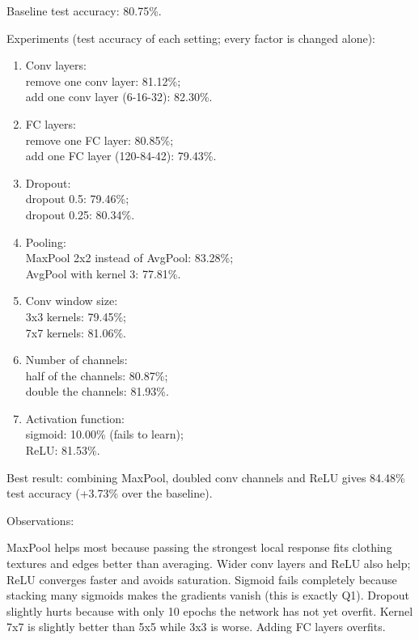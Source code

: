 \documentclass[11pt,a4paper]{article}
\begin{document}
Baseline test accuracy: 80.75\%.

Experiments (test accuracy of each setting; every factor is changed
alone):

\begin{enumerate}
    \item[(a)] Conv layers: \\
    remove one conv layer: 81.12\%; \\
    add one conv layer (6-16-32): 82.30\%.

    \item[(b)] FC layers: \\
    remove one FC layer: 80.85\%; \\
    add one FC layer (120-84-42): 79.43\%.

    \item[(c)] Dropout: \\
    dropout 0.5: 79.46\%; \\
    dropout 0.25: 80.34\%.

    \item[(d)] Pooling: \\
    MaxPool 2x2 instead of AvgPool: 83.28\%; \\
    AvgPool with kernel 3: 77.81\%.

    \item[(e)] Conv window size: \\
    3x3 kernels: 79.45\%; \\
    7x7 kernels: 81.06\%.

    \item[(f)] Number of channels: \\
    half of the channels: 80.87\%; \\
    double the channels: 81.93\%.

    \item[(g)] Activation function: \\
    sigmoid: 10.00\% (fails to learn); \\
    ReLU: 81.53\%.
\end{enumerate}

Best result: combining MaxPool, doubled conv channels and ReLU gives
84.48\% test accuracy (+3.73\% over the baseline).

Observations:

MaxPool helps most because passing the strongest local response fits
clothing textures and edges better than averaging. Wider conv layers and
ReLU also help; ReLU converges faster and avoids saturation. Sigmoid
fails completely because stacking many sigmoids makes the gradients
vanish (this is exactly Q1). Dropout slightly hurts because with only 10
epochs the network has not yet overfit. Kernel 7x7 is slightly better
than 5x5 while 3x3 is worse. Adding FC layers overfits.
\end{document}
